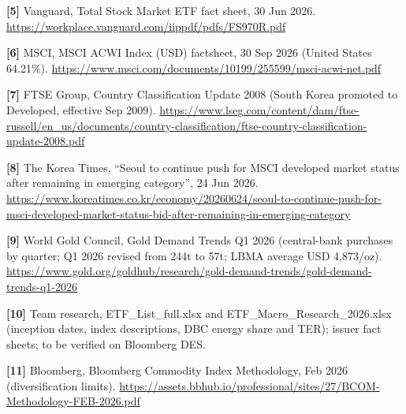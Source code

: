 \documentclass[
]{article}
\begin{document}
\textbf{{[}5{]}} Vanguard, Total Stock Market ETF fact sheet, 30 Jun
2026. \url{https://workplace.vanguard.com/iippdf/pdfs/FS970R.pdf}

\textbf{{[}6{]}} MSCI, MSCI ACWI Index (USD) factsheet, 30 Sep 2026
(United States 64.21\%).
\url{https://www.msci.com/documents/10199/255599/msci-acwi-net.pdf}

\textbf{{[}7{]}} FTSE Group, Country Classification Update 2008 (South
Korea promoted to Developed, effective Sep 2009).
\url{https://www.lseg.com/content/dam/ftse-russell/en_us/documents/country-classification/ftse-country-classification-update-2008.pdf}

\textbf{{[}8{]}} The Korea Times, ``Seoul to continue push for MSCI
developed market status after remaining in emerging category'', 24 Jun
2026.
\url{https://www.koreatimes.co.kr/economy/20260624/seoul-to-continue-push-for-msci-developed-market-status-bid-after-remaining-in-emerging-category}

\textbf{{[}9{]}} World Gold Council, Gold Demand Trends Q1 2026
(central-bank purchases by quarter; Q1 2026 revised from 244t to 57t;
LBMA average USD 4,873/oz).
\url{https://www.gold.org/goldhub/research/gold-demand-trends/gold-demand-trends-q1-2026}

\textbf{{[}10{]}} Team research, ETF\_List\_full.xlsx and
ETF\_Macro\_Research\_2026.xlsx (inception dates, index descriptions,
DBC energy share and TER); issuer fact sheets; to be verified on
Bloomberg DES.

\textbf{{[}11{]}} Bloomberg, Bloomberg Commodity Index Methodology, Feb
2026 (diversification limits).
\url{https://assets.bbhub.io/professional/sites/27/BCOM-Methodology-FEB-2026.pdf}
\end{document}
